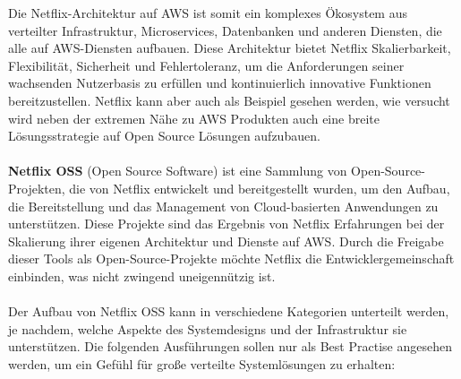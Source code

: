 \documentclass[../vs-script-first-v01.tex]{subfiles}
\begin{document}
Die Netflix-Architektur auf AWS ist somit ein komplexes Ökosystem aus verteilter Infrastruktur, Microservices, Datenbanken und anderen Diensten, die alle auf AWS-Diensten aufbauen. Diese Architektur bietet Netflix Skalierbarkeit, Flexibilität, Sicherheit und Fehlertoleranz, um die Anforderungen seiner wachsenden Nutzerbasis zu erfüllen und kontinuierlich innovative Funktionen bereitzustellen.
Netflix kann aber auch als Beispiel gesehen werden, wie versucht wird neben der extremen Nähe zu AWS Produkten auch eine breite Lösungsstrategie auf Open Source Lösungen aufzubauen. 
\\\\
\textbf{Netflix OSS} (Open Source Software) ist eine Sammlung von Open-Source-Projekten, die von Netflix entwickelt und bereitgestellt wurden, um den Aufbau, die Bereitstellung und das Management von Cloud-basierten Anwendungen zu unterstützen. Diese Projekte sind das Ergebnis von Netflix Erfahrungen bei der Skalierung ihrer eigenen Architektur und Dienste auf AWS. Durch die Freigabe dieser Tools als Open-Source-Projekte möchte Netflix die Entwicklergemeinschaft einbinden, was nicht zwingend uneigennützig ist.
\\\\
Der Aufbau von Netflix OSS kann in verschiedene Kategorien unterteilt werden, je nachdem, welche Aspekte des Systemdesigns und der Infrastruktur sie unterstützen. Die folgenden Ausführungen sollen nur als Best Practise angesehen werden, um ein Gefühl für große verteilte Systemlösungen zu erhalten:
\end{document}
